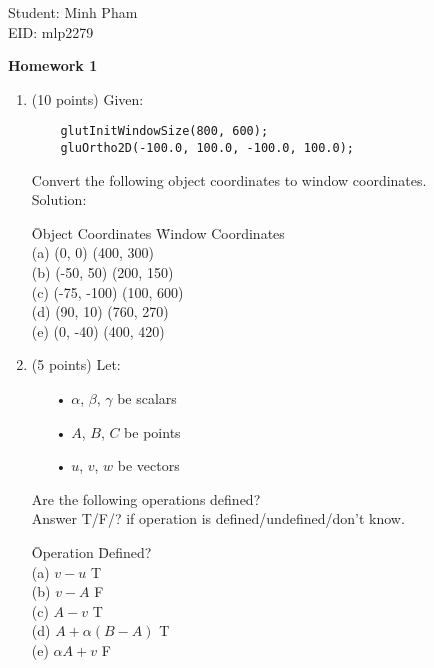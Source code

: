\documentclass[13pt]{letter}
\begin{document}
Student: Minh Pham \\
EID: mlp2279

\begin{center}
	\textbf{Homework 1}
\end{center}

\begin{enumerate}
	\item (10 points)
	Given:
	\begin{verbatim}
	glutInitWindowSize(800, 600);
	gluOrtho2D(-100.0, 100.0, -100.0, 100.0);	
	\end{verbatim}

	Convert the following object coordinates to window coordinates. \\
	
	Solution:
	\begin{tabbing}
	\hspace{20pt} \= Object Coordinates \= Window Coordinates \\
	(a)           \> (0, 0)             \> (400, 300) \\
	(b)           \> (-50, 50)          \> (200, 150) \\
	(c)	          \> (-75, -100)        \> (100, 600) \\
	(d)	          \> (90, 10)           \> (760, 270) \\
	(e)	          \> (0, -40)           \> (400, 420) \\
	\end{tabbing}
	

	\item (5 points)
	Let:
	\begin{enumerate}
	\item[•] $\alpha$, $\beta$, $\gamma$ be scalars
	\item[•] $A$, $B$, $C$ be points
	\item[•] $u$, $v$, $w$ be vectors
	\end{enumerate}
	
	Are the following operations defined? \\
	Answer T/F/? if operation is defined/undefined/don't know. \\

	\begin{tabbing}
	\hspace{20pt} \= Operation \hspace{20pt} \= Defined?  \\
	(a)           \> $v - u$                 \> T \\
	(b)           \> $v - A$                 \> F \\
	(c)           \> $A - v$                 \> T \\
	(d)           \> $A + \alpha(B-A)$       \> T \\
	(e)           \> $\alpha A + v$          \> F \\
	\end{tabbing}
	

\end{enumerate}
\end{document}
